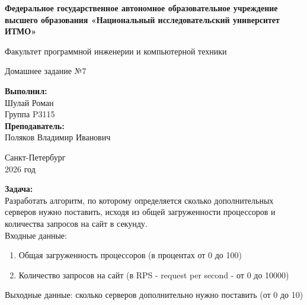 \documentclass[a4paper,12pt]{article}
\begin{document}
\begin{titlepage}
    \centering
    {\Large \bfseries Федеральное государственное автономное образовательное учреждение высшего образования «Национальный исследовательский университет ИТМО» \par}
    
    {\large Факультет программной инженерии и компьютерной техники \par}
    \vspace{2cm}
    {\LARGE Домашнее задание №7 \par}
    \vspace{0.5cm}
    \vspace{2cm}
    \vfill
    \begin{flushright}
        \large
        \textbf{Выполнил:} \\
        Шулай Роман \\
        Группа P3115 \\
        \vspace{1cm}
        \textbf{Преподаватель:} \\
        Поляков Владимир Иванович \\
    \end{flushright}
    \vfill
    {\large Санкт-Петербург \\ 2026 год}
\end{titlepage}
\newpage
\setcounter{page}{2}

\textbf{Задача:} \\
Разработать алгоритм, по которому определяется сколько дополнительных серверов нужно поставить, исходя из общей загруженности процессоров и количества запросов на сайт в секунду. \\
Входные данные:
\begin{enumerate}
    \item Общая загруженность процессоров (в процентах от 0 до 100)
    \item Количество запросов на сайт (в RPS - request per second - от 0 до 10000)
\end{enumerate}
Выходные данные: сколько серверов дополнительно нужно поставить (от 0 до 10) \\
\end{document}
